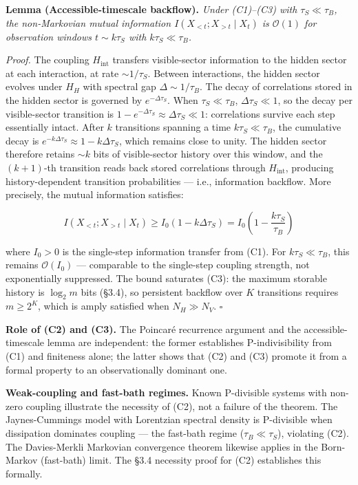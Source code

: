 \documentclass[
]{article}
\begin{document}
\textbf{Lemma (Accessible-timescale backflow).} \emph{Under (C1)--(C3)
with \(\tau_S \ll \tau_B\), the non-Markovian mutual information
\(I(X_{<t}; X_{>t} \mid X_t)\) is \(\mathcal{O}(1)\) for observation
windows \(t \sim k\tau_S\) with \(k\tau_S \ll \tau_B\).}

\emph{Proof.} The coupling \(H_{\text{int}}\) transfers visible-sector
information to the hidden sector at each interaction, at rate
\(\sim 1/\tau_S\). Between interactions, the hidden sector evolves under
\(H_H\) with spectral gap \(\Delta \sim 1/\tau_B\). The decay of
correlations stored in the hidden sector is governed by
\(e^{-\Delta \tau_S}\). When \(\tau_S \ll \tau_B\),
\(\Delta \tau_S \ll 1\), so the decay per visible-sector transition is
\(1 - e^{-\Delta \tau_S} \approx \Delta \tau_S \ll 1\): correlations
survive each step essentially intact. After \(k\) transitions spanning a
time \(k\tau_S \ll \tau_B\), the cumulative decay is
\(e^{-k\Delta\tau_S} \approx 1 - k\Delta\tau_S\), which remains close to
unity. The hidden sector therefore retains \(\sim k\) bits of
visible-sector history over this window, and the \((k+1)\)-th transition
reads back stored correlations through \(H_{\text{int}}\), producing
history-dependent transition probabilities --- i.e., information
backflow. More precisely, the mutual information satisfies:

\[I(X_{<t}; X_{>t} \mid X_t) \geq I_0(1 - k\Delta\tau_S) = I_0\left(1 - \frac{k\tau_S}{\tau_B}\right)\]

where \(I_0 > 0\) is the single-step information transfer from (C1). For
\(k\tau_S \ll \tau_B\), this remains \(\mathcal{O}(I_0)\) --- comparable
to the single-step coupling strength, not exponentially suppressed. The
bound saturates (C3): the maximum storable history is \(\log_2 m\) bits
(§3.4), so persistent backflow over \(K\) transitions requires
\(m \geq 2^K\), which is amply satisfied when \(N_H \gg N_V\).
\(\square\)

\textbf{Role of (C2) and (C3).} The Poincaré recurrence argument and the
accessible-timescale lemma are independent: the former establishes
P-indivisibility from (C1) and finiteness alone; the latter shows that
(C2) and (C3) promote it from a formal property to an observationally
dominant one.

\textbf{Weak-coupling and fast-bath regimes.} Known P-divisible systems
with non-zero coupling illustrate the necessity of (C2), not a failure
of the theorem. The Jaynes-Cummings model with Lorentzian spectral
density is P-divisible when dissipation dominates coupling --- the
fast-bath regime (\(\tau_B \ll \tau_S\)), violating (C2). The
Davies-Merkli Markovian convergence theorem likewise applies in the
Born-Markov (fast-bath) limit. The §3.4 necessity proof for (C2)
establishes this formally.
\end{document}

